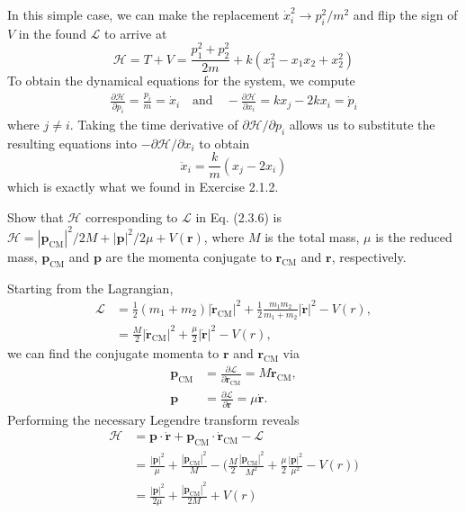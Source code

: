 \documentclass[../principles-of-quantum-mechanics.tex]{subfiles}
\begin{document}
\begin{questions}
		\begin{solution}
			In this simple case, we can make the replacement $\dot{x}_i^2 \to p_i^2/m^2$ and flip the sign of $V$ in the found $\mathcal{L}$ to arrive at
			\[
				\mathcal{H} = T + V = \frac{p_1^2 + p_2^2}{2m} + k(x_1^2 - x_1x_2 + x_2^2)
			\]
			To obtain the dynamical equations for the system, we compute
			\begin{align*}
				\frac{\partial\mathcal{H}}{\partial p_i} = \frac{p_i}{m} = \dot{x}_i \quad \text{and} \quad -\frac{\partial\mathcal{H}}{\partial x_i} = kx_j - 2kx_i = \dot{p}_i
			\end{align*}
			where $j \neq i$. Taking the time derivative of $\partial\mathcal{H}/\partial p_i$ allows us to substitute the resulting equations into $-\partial\mathcal{H}/\partial{x}_i$ to obtain
			\[
				\ddot{x}_i = \frac{k}{m}(x_j - 2x_i)
			\]
			which is exactly what we found in Exercise 2.1.2.
		\end{solution}
		
		\question Show that $\mathcal{H}$ corresponding to $\mathcal{L}$ in Eq. (2.3.6) is $\mathcal{H}=|\mathbf{p}_{\text{CM}}|^2/2M + |\mathbf{p}|^2/2\mu + V(\mathbf{r})$, where $M$ is the total mass, $\mu$ is the reduced mass, $\mathbf{p}_{\text{CM}}$ and $\mathbf{p}$ are the momenta conjugate to $\mathbf{r}_{\text{CM}}$ and $\mathbf{r}$, respectively.
		
		\begin{solution}
			Starting from the Lagrangian,
			\begin{align*}
				\mathcal{L} &= \frac{1}{2}(m_1+m_2)|\dot{\mathbf{r}}_{\mathrm{CM}}|^2 + \frac{1}{2}\frac{m_1m_2}{m_1+m_2}|\dot{\mathbf{r}}|^2 - V(r), \\
				&= \frac{M}{2}|\dot{\mathbf{r}}_{\mathrm{CM}}|^2 + \frac{\mu}{2}|\dot{\mathbf{r}}|^2 - V(r),
			\end{align*}
			we can find the conjugate momenta to $\mathbf{r}$ and $\mathbf{r}_{\mathrm{CM}}$ via
			\begin{align*}
				\mathbf{p}_{\mathrm{CM}} &= \frac{\partial\mathcal{L}}{\partial\dot{\mathbf{r}}_{\mathrm{CM}}} = M\dot{\mathbf{r}}_{\mathrm{CM}}, \\
				\mathbf{p} &= \frac{\partial\mathcal{L}}{\partial\dot{\mathbf{r}}} = \mu\dot{\mathbf{r}}.
			\end{align*}
			Performing the necessary Legendre transform reveals
			\begin{align*}
				\mathcal{H} &= \mathbf{p}\cdot\dot{\mathbf{r}} + \mathbf{p}_{\mathrm{CM}}\cdot\dot{\mathbf{r}}_{\mathrm{CM}} - \mathcal{L} \\
				&= \frac{|\mathbf{p}|^2}{\mu} + \frac{|\mathbf{p}_{\mathrm{CM}}|^2}{M} - \Big(\frac{M}{2}\frac{|\mathbf{p}_{\mathrm{CM}}|^2}{M^2} + \frac{\mu}{2}\frac{|\mathbf{p}|^2}{\mu^2} - V(r)\Big) \\
				&= \frac{|\mathbf{p}|^2}{2\mu} + \frac{|\mathbf{p}_{\mathrm{CM}}|^2}{2M} + V(r)
			\end{align*}
		\end{solution}
	

\end{questions}
\end{document}
